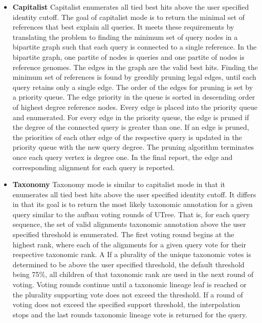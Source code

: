 \begin{itemize}

 \item \textbf{Capitalist} Capitalist enumerates all tied best hits above the user specified identity cutoff. The goal of capitalist mode is to return the minimal set of references that best explain all queries. It meets these requirements by translating the problem to finding the minimum set of query nodes in a bipartite graph such that each query is connected to a single reference. In the bipartite graph, one partite of nodes is queries and one partite of nodes is reference genomes. The edges in the graph are the valid best hits. Finding the minimum set of references is found by greedily pruning legal edges, until each query retains only a single edge. The order of the edges for pruning is set by a priority queue. The edge priority in the queue is sorted in descending order of highest degree reference nodes. Every edge is placed into the priority queue and enumerated. For every edge in the priority queue, the edge is pruned if the degree of the connected query is greater than one. If an edge is pruned, the priorities of each other edge of the respective query is updated in the priority queue with the new query degree. The pruning algorithm terminates once each query vertex is degree one. In the final report, the edge and corresponding alignment for each query is reported.

\item \textbf{Taxonomy} Taxonomy mode is similar to capitalist mode in that it enumerates all tied best hits above the user specified identity cutoff. It differs in that its goal is to return the most likely taxonomic annotation for a given query similar to the aufbau voting rounds of UTree. That is, for each query sequence, the set of valid alignments taxonomic annotation above the user specified threshold is enumerated. The first voting round begins at the highest rank, where each of the alignments for a given query vote for their respective taxonomic rank. A If a plurality of the unique taxonomic votes is determined to be above the user specified threshold, the default threshold being 75\%, all children of that taxonomic rank are used in the next round of voting. Voting rounds continue until a taxonomic lineage leaf is reached or the plurality supporting vote does not exceed the threshold. If a round of voting does not exceed the specified support threshold, the interpolation stops and the last rounds taxonomic lineage vote is returned for the query.

\end{itemize}

